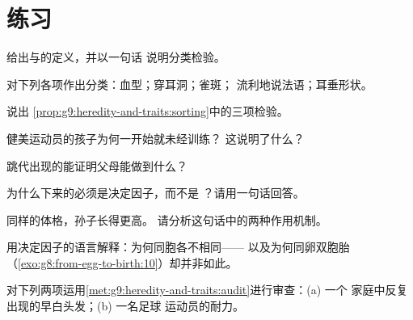 \section{练习}

\begin{exercise}[$\star$]\label{exo:g9:heredity-and-traits:1}
给出与的定义，并以一句话
说明分类检验。
\end{exercise}

\begin{exercise}[$\star$]\label{exo:g9:heredity-and-traits:2}
对下列各项作出分类：血型；穿耳洞；雀斑；
流利地说法语；耳垂形状。
\end{exercise}

\begin{exercise}[$\star$]\label{exo:g9:heredity-and-traits:3}
说出
\cref{prop:g9:heredity-and-traits:sorting}中的三项检验。
\end{exercise}

\begin{exercise}[$\star$]\label{exo:g9:heredity-and-traits:4}
健美运动员的孩子为何一开始就未经训练？
这说明了什么？
\end{exercise}

\begin{exercise}[$\star$]\label{exo:g9:heredity-and-traits:5}
跳代出现的能证明父母能做到什么？
\end{exercise}

\begin{exercise}[$\star$]\label{exo:g9:heredity-and-traits:6}
为什么下来的必须是决定因子，而不是
？请用一句话回答。
\end{exercise}

\begin{exercise}[$\star\star$]\label{exo:g9:heredity-and-traits:7}
同样的体格，孙子长得更高。
请分析这句话中的两种作用机制。
\end{exercise}

\begin{exercise}[$\star\star$]\label{exo:g9:heredity-and-traits:8}
用决定因子的语言解释：为何同胞各不相同——
以及为何同卵双胞胎
（\cref{exo:g8:from-egg-to-birth:10}）却并非如此。
\end{exercise}

\begin{exercise}[$\star\star$]\label{exo:g9:heredity-and-traits:9}
对下列两项运用\cref{met:g9:heredity-and-traits:audit}进行审查：(a) 一个
家庭中反复出现的早白头发；(b) 一名足球
运动员的耐力。
\end{exercise}

